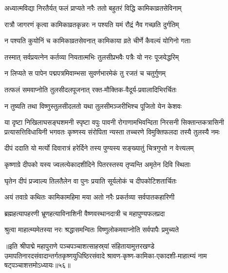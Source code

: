 \twolineshloka
{अध्यात्मविद्या निरतैर्यत् फलं प्राप्यते नरैः}
{ततो बहुतरं विद्धि कामिकाव्रतसेविनाम्}%

\twolineshloka
{रात्रौ जागरणं कृत्वा कामिकाव्रतकृन्नरः}
{न पश्यति यमं रौद्रं नैव गच्छति दुर्गतिम्}%

\twolineshloka
{न पश्यति कुयोनिं च कामिकाव्रतसेवनात्}
{कामिकाया व्रते चीर्णे कैवल्यं योगिनो गताः}%

\twolineshloka
{तस्मात् सर्वप्रयत्नेन कर्तव्या नियतात्मभिः}
{तुलसीप्रभवैः पत्रैः यो नरः पूजयेद्धरिम्}%

\twolineshloka
{न लिप्यते स पापेन पद्मपत्रमिवाम्भसा}
{सुवर्णभारमेकं तु रजतं च चतुर्गुणम्}%

\twolineshloka
{तत्फलं समवाप्नोति तुलसीदलपूजनात्}
{रक्त-मौक्तिक-वैदूर्य-प्रवालादिभिरर्चितः}%

\twolineshloka
{न तुष्यति तथा विष्णुस्तुलसीदलतो यथा}
{तुलसीमञ्जरीभिश्च पूजितो येन केशवः}%

\fourlineindentedshloka
{या दृष्टा निखिलाघसङ्घशमनी स्पृष्टा वपुः पावनी}
{रोगाणामभिवन्दिता निरसनी सिक्तान्तकत्रासिनी}
{प्रत्यासत्तिविधायिनी भगवतः कृष्णस्य संरोपिता}
{न्यस्ता तच्चरणे विमुक्तिफलदा तस्यै तुलस्यै नमः}%

\twolineshloka
{दीपं ददाति यो मर्त्यो दिवारात्रं हरेर्दिने}
{तस्य पुण्यस्य सङ्ख्यातुं चित्रगुप्तो न वेत्त्यलम्}%

\twolineshloka
{कृष्णाग्रे दीपको यस्य ज्वलत्येकादशीदिने}
{पितरस्तस्य तृप्यन्ति अमृतेन दिवि स्थिताः}%

\twolineshloka
{घृतेन दीपं प्रज्वाल्य तिलतैलेन वा पुनः}
{प्रयाति सूर्यलोकं च दीपकोटिशतार्चितः}%

\twolineshloka
{अयं तवाग्रे कथितः कामिकामहिमा मया}
{अतो नरैः प्रकर्तव्या सर्वपातकहारिणी}%

\twolineshloka
{ब्रह्महत्यापहरणी भ्रूणहत्याविनाशिनी}
{वैष्णवस्थानदात्री च महापुण्यफलप्रदा}%

\twolineshloka
{श्रुत्वा माहात्म्यमेतस्या नरः श्रद्धासमन्वितः}
{विष्णुलोकमवाप्नोति सर्वपापैः प्रमुच्यते}%

॥इति श्रीपाद्मे महापुराणे पञ्चपञ्चाशत्साहस्र्यां संहितायामुत्तरखण्डे उमापतिनारदसंवादान्तर्गतकृष्णयुधिष्ठिरसंवादे श्रावण-कृष्ण-कामिका-एकादशी-माहात्म्यं नाम षट्पञ्चाशत्तमोऽध्यायः॥५६॥

\genMangalaShloka

\hyperref[sec:ekadashi_mahatmyam_padma_puranam]{\closesub}
\clearpage

